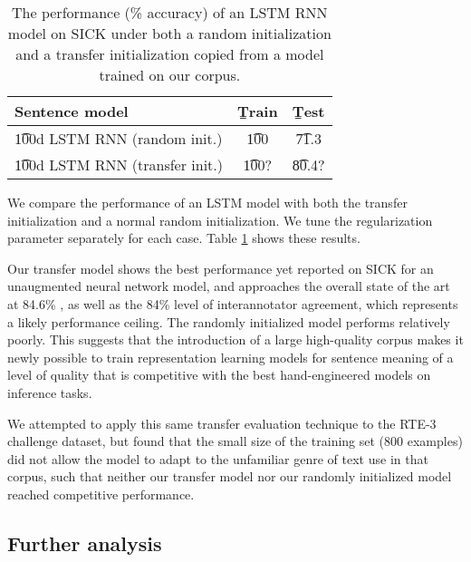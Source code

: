 \begin{table}
\begin{center}
\begin{tabular}{l@{\hskip \colspaceL}@{\hskip \colspaceL}c@{\hskip \colspaceL}c}
\hline
\textbf{Sentence model} & \b{Train}  & \b{Test}\\
\hline
\t{100d LSTM RNN (random init.)}            & \t{100} & \t{71.3} \\
\t{100d LSTM RNN (transfer init.)}            & \t{100?} & \t{80.4?} \\
\hline
\end{tabular}
\end{center}

\caption{\label{tab:transferresults}
The performance (\% accuracy) of an LSTM RNN model on SICK under both a random initialization and a transfer initialization copied from a model trained on our corpus.  } 
\end{table}

We compare the performance of an LSTM model with both the transfer initialization and a normal random initialization. We tune the regularization parameter separately for each case. Table \ref{tab:transferresults} shows these results.

Our transfer model shows the best performance yet reported on SICK for an unaugmented neural network model, and approaches the overall state of the art at 84.6\% \cite{lai2014illinois}, as well as the 84\% level of interannotator agreement, which represents a likely performance ceiling. The randomly initialized model performs relatively poorly. This suggests that the introduction of a large high-quality corpus makes it newly possible to train representation learning models for sentence meaning of a level of quality that is competitive with the best hand-engineered models on inference tasks.


We attempted to apply this same transfer evaluation technique to the RTE-3 challenge dataset, but found that the small size of the training set (800 examples) did not allow the model to adapt to the unfamiliar genre of text use in that corpus, such that neither our transfer model nor our randomly initialized model reached competitive performance.

\subsection{Further analysis}

